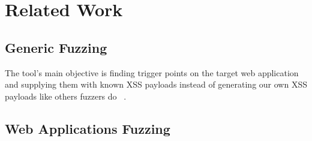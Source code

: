 \chapter{Related Work}
\label{sec:relatedwork}
\minitoc
\vspace*{1cm}

\section{Generic Fuzzing}
The tool's main objective is finding trigger points on the target web application and supplying them with known XSS payloads instead of generating our own XSS payloads like others fuzzers do ~\cite{duchene2014kameleonfuzz}.

\section{Web Applications Fuzzing}
